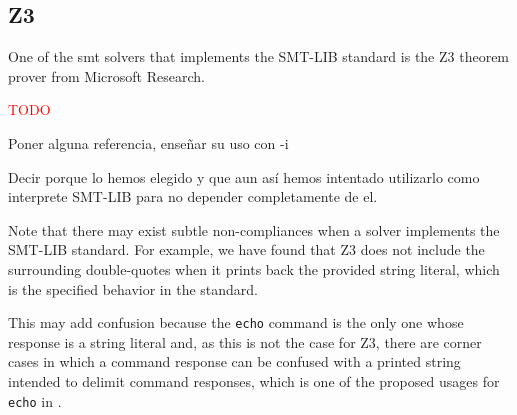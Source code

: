 \subsection{Z3}

One of the \gls{smt} solvers that implements the SMT-LIB standard is the Z3
theorem prover from Microsoft Research.

\textcolor{red}{TODO}

Poner alguna referencia, enseñar su uso con -i

Decir porque lo hemos elegido y que aun así hemos intentado utilizarlo como 
interprete SMT-LIB para no depender completamente de el.

Note that there may exist subtle non-compliances when a solver implements the
SMT-LIB standard. For example, we have found that Z3 does not include the
surrounding double-quotes when it prints back the provided string literal,
which is the specified behavior in the standard.

This may add confusion because the \verb|echo| command is the only one whose
response is a string literal and, as this is not the case for Z3, there are 
corner cases in which a command response can be confused with a printed string
intended to delimit command responses, which is one of the proposed usages for
\verb|echo| in \cite{smtLibStandard}.
